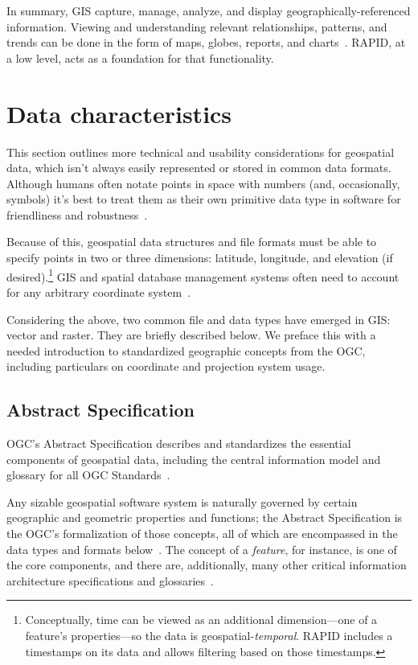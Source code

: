In summary, GIS capture, manage, analyze, and display geographically-referenced information. Viewing and understanding relevant relationships, patterns, and trends can be done in the form of maps, globes, reports, and charts~\cite{Esriintro}. RAPID, at a low level, acts as a foundation for that functionality.

\section{Data characteristics}
This section outlines more technical and usability considerations for geospatial data, which isn't always easily represented or stored in common data formats. Although humans often notate points in space with numbers (and, occasionally, symbols) it's best to treat them as their own primitive data type in software for friendliness and robustness~\cite{gentle_intro}.

Because of this, geospatial data structures and file formats must be able to specify points in two or three dimensions: latitude, longitude, and elevation (if desired).\footnote{Conceptually, time can be viewed as an additional dimension---one of a feature's properties---so the data is geospatial-\textit{temporal}. RAPID includes a timestamps on its data and allows filtering based on those timestamps.} GIS and spatial database management systems often need to account for any arbitrary coordinate system~\cite{gentle_intro}.

Considering the above, two common file and data types have emerged in GIS: vector and raster. They are briefly described below. We preface this with a needed introduction to standardized geographic concepts from the OGC, including particulars on coordinate and projection system usage.

\subsection{Abstract Specification}
OGC's Abstract Specification describes and standardizes the essential components of geospatial data, including the central information model and glossary for all OGC Standards~\cite{AbstractSpecFaq}.

Any sizable geospatial software system is naturally governed by certain geographic and geometric properties and functions; the Abstract Specification is the OGC's formalization of those concepts, all of which are encompassed in the data types and formats below~\cite{AbstractSpecFaq}. The concept of a \textit{feature}, for instance, is one of the core components, and there are, additionally, many other critical information architecture specifications and glossaries~\cite{Kottman2009,AbstractSpecFaq}.

